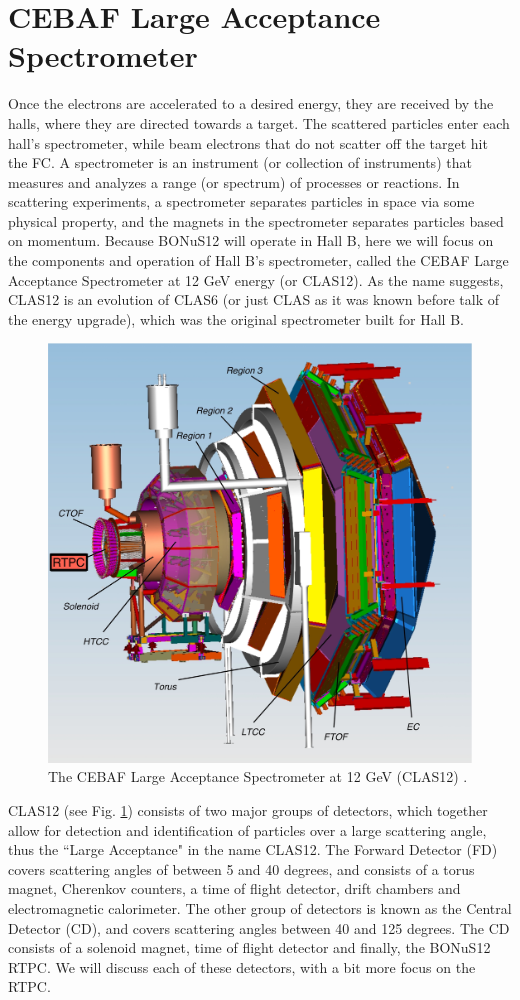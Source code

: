 \section{CEBAF Large Acceptance Spectrometer}
Once the electrons are accelerated to a desired energy, they are received by the halls, where they are directed towards a target. The scattered particles enter each hall's spectrometer, while beam electrons that do not scatter off the target hit the FC. A spectrometer is an instrument (or collection of instruments) that measures and analyzes a range (or spectrum) of processes or reactions. In scattering experiments, a spectrometer separates particles in space via some physical property, and the magnets in the spectrometer separates particles based on momentum. Because BONuS12 will operate in Hall B, here we will focus on the components and operation of Hall B's spectrometer, called the CEBAF Large Acceptance Spectrometer at 12 GeV energy (or CLAS12). As the name suggests, CLAS12 is an evolution of CLAS6 (or just CLAS as it was known before talk of the energy upgrade), which was the original spectrometer built for Hall B. 

\begin{figure}[h!]
	\centering
	\includegraphics[width=0.8\linewidth]{figures/clas12.png}
	\caption[The CEBAF Large Acceptance Spectrometer at 12 GeV (CLAS12).]{The CEBAF Large Acceptance Spectrometer at 12 GeV (CLAS12) \cite{pres:CEBAF}.}
	\label{fig:clas12}
\end{figure}

CLAS12 (see Fig. \ref{fig:clas12}) consists of two major groups of detectors, which together allow for detection and identification of particles over a large scattering angle, thus the ``Large Acceptance" in the name CLAS12. The Forward Detector (FD) covers scattering angles of between 5 and 40 degrees, and consists of a torus magnet, Cherenkov counters, a time of flight detector, drift chambers and electromagnetic calorimeter. The other group of detectors is known as the Central Detector (CD), and covers scattering angles between 40 and 125 degrees.\cite{CLAS12} The CD consists of a solenoid magnet, time of flight detector and finally, the BONuS12 RTPC. We will discuss each of these detectors, with a bit more focus on the RTPC.

